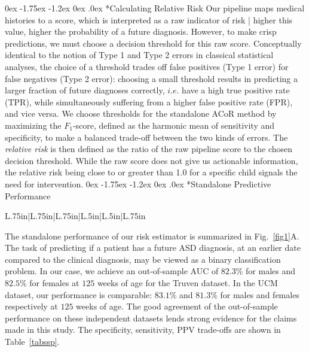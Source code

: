 \documentclass[onecolumn, compsoc,11pt]{IEEEtran}
\makeatletter
\renewcommand\subsection{\@startsection {subsection}{2}{\z@}%
                                   {0ex \@plus -1.75ex \@minus -1.2ex}%
                                   {0ex \@plus.0ex}%
                                   {\fontsize{11}{11}\selectfont\bfseries\sffamily\color{black}}}
\renewcommand{\captionN}[1]{\caption{\color{CadetBlue4!80!black} \sffamily \fontsize{9}{10}\selectfont #1  }}
\def\ZERO{ACoR\xspace}
\makeatother
\begin{document}
\subsection*{Calculating Relative Risk}
Our pipeline maps medical histories to a  score, which is interpreted as a raw indicator of 
risk | higher this value, higher the probability of a future diagnosis. However, to make crisp predictions, we must choose  a decision threshold for this raw score. Conceptually identical to the notion of Type 1 and Type 2 errors in classical statistical analyses, the choice of a threshold trades off false positives (Type 1 error) for false negatives (Type 2 error): choosing a small threshold  results in predicting a larger fraction of future diagnoses correctly, $i.e.$ have a high true positive rate (TPR), while simultaneously suffering from a higher false positive rate (FPR), and vice versa.
We choose thresholds for the standalone \ZERO method by  maximizing the $F_1$-score, defined as the harmonic mean of sensitivity and specificity, to make a   balanced trade-off between the two kinds of errors.
%
The \textit{relative risk} is then defined as the ratio of the raw pipeline score to the chosen decision threshold. While the raw score does not give us  actionable information,  the relative risk being close to or greater than 1.0 for a specific child signals the need for intervention.
%
\subsection*{Standalone Predictive Performance}
\def\RCOL{\rowcolor{teal!40}}
\begin{table}[t]   
\centering 
\captionN{Standalone \ZERO PPV Achieved}\label{tabssp}
\footnotesize
{}
%
%
\begin{tabular}{L{.75in}|L{.75in}|L{.75in}|L{.5in}|L{.5in}|L{.75in}}
\hline

\end{tabular}
\end{table}  
The standalone performance of our risk estimator is summarized  in Fig.~\ref{fig1}A. The task of predicting if a patient has a future ASD diagnosis, at an earlier date compared to the clinical diagnosis,  may be viewed as a binary classification problem.
In our case, we achieve an out-of-sample AUC of $82.3\%$ for males and $82.5\%$ for females at $125$ weeks of age for the Truven dataset. In the UCM dataset, our performance is comparable: $83.1\%$ and $81.3\%$ for males and females respectively at $125$ weeks of age. The good agreement of the out-of-sample performance on these independent datasets lends strong evidence for the claims made in this study. The specificity, sensitivity, PPV trade-offs are shown in Table~\ref{tabssp}.
\end{document}
